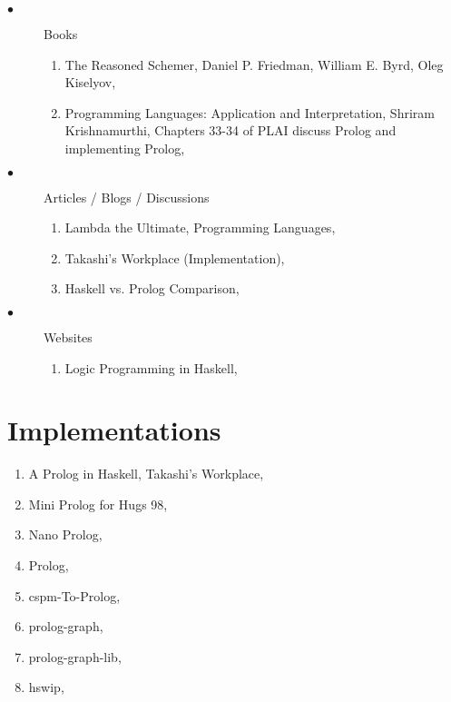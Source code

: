 \documentclass[proposal.tex]{subfiles}
\begin{document}
\begin{description}
\item[$\bullet$] Books
\begin{enumerate}
\item  The Reasoned Schemer, Daniel P. Friedman, William E. Byrd, Oleg Kiselyov, \cite{friedman05reasoned}

\item Programming Languages: Application and Interpretation, Shriram Krishnamurthi, Chapters 33-34 of PLAI discuss Prolog and implementing Prolog, \cite{krishnamurthi2007programming}

\end{enumerate}

\item[$\bullet$] Articles / Blogs / Discussions
\begin{enumerate}
\item Lambda the Ultimate, Programming Languages, \cite{website:lambda-the-ultimate}

\item Takashi's Workplace (Implementation), \cite{website:takashi-workplace}

\item Haskell vs. Prolog Comparison, \cite{website:stackoverflow}
 
\end{enumerate}

\item[$\bullet$] Websites
\begin{enumerate}

\item Logic Programming in Haskell, \cite{website:logic-programming-haskell}

\end{enumerate}

\end{description}


\section{Implementations}
\begin{enumerate}
\item A Prolog in Haskell, Takashi's Workplace, \cite{website:takashi-workplace}

\item Mini Prolog for Hugs 98, \cite{website:mini-prolog-hugs98}

\item Nano Prolog, \cite{nanoprolog-lib}

\item Prolog, \cite{prolog-lib}

\item cspm-To-Prolog, \cite{cspm-To-Prolog-lib}

\item prolog-graph, \cite{prolog-graph-lib}

\item prolog-graph-lib, \cite{prolog-graph-lib-lib}

\item hswip, \cite{hswip-lib}

\end{enumerate}
\end{document}
